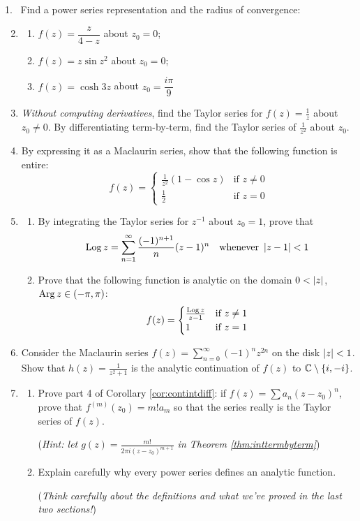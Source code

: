 \goodbreak

\begin{exercises*}\hangindent\leftmargini
\textup{1.} \ Find a power series representation and the radius of convergence:
\begin{enumerate}\setcounter{enumi}{1}
  \item[]\begin{enumerate}
    \item $f(z)=\dfrac z{4-z}$ about $z_0=0$;
    \item $f(z)=z\sin z^2$ about $z_0=0$;
    \item $f(z)=\cosh 3z$ about $z_0=\dfrac{i\pi}9$
	\end{enumerate}
	
	\item \emph{Without computing derivatives}, find the Taylor series for $f(z)=\frac 1z$ about $z_0\neq 0$. By differentiating term-by-term, find the Taylor series of $\frac 1{z^2}$ about $z_0$.
	
	\item By expressing it as a Maclaurin series, show that the following function is entire:
	\[f(z)=\begin{cases} 
	\frac 1{z^2}(1-\cos z)&\text{if }z\neq 0\\
	\frac 12&\text{if }z=0
	\end{cases}\]
	
	\item\begin{enumerate}
	  \item By integrating the Taylor series for $z^{-1}$ about $z_0=1$, prove that 
	  \[\operatorname{Log} z=\sum_{n=1}^\infty\frac{(-1)^{n+1}}n(z-1)^n\quad\text{whenever }\left| z-1\right|<1\]
	  \item Prove that the following function is analytic on the domain $0<\left| z\right|$, \ $\operatorname{Arg} z\in(-\pi,\pi)$:
	  \[f(z)=\begin{cases} 
		\frac{\operatorname{Log} z}{z-1}&\text{if }z\neq 1\\
		1&\text{if }z=1
		\end{cases}\]
	\end{enumerate}
	
	\item Consider the Maclaurin series $f(z)=\sum_{n=0}^\infty (-1)^nz^{2n}$ on the disk $\left| z\right|<1$. Show that $h(z)=\frac 1{z^2+1}$ is the analytic continuation of $f(z)$ to $\mathbb{C}\setminus\{i,-i\}$. 
	
	\item\label{ex:uniquetaylor}\begin{enumerate}
	  \item Prove part 4 of Corollary \ref{cor:contintdiff}: if $f(z)= \sum a_n(z-z_0)^n$, prove that $f^{(m)}(z_0)=m!a_m$ so that the series really is the Taylor series of $f(z)$.\par
		(\emph{Hint: let $g(z) =\frac{m!}{2\pi i(z-z_0)^{m+1}}$ in Theorem \ref{thm:inttermbyterm}})
		\item Explain carefully why every power series defines an analytic function.\par
  (\emph{Think carefully about the definitions and what we've proved in the last two sections!})
	\end{enumerate}
	

\end{enumerate}
\end{exercises*}
